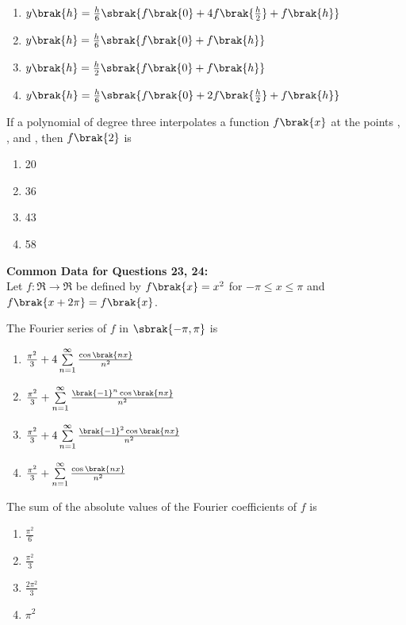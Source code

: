  \begin{enumerate}
     \item $y\brak{h} = \frac{h}{6}\sbrak{f\brak{0} + 4f\brak{\frac{h}{2}} + f\brak{h}}$
     \item $y\brak{h} = \frac{h}{6}\sbrak{f\brak{0} + f\brak{h}}$
     \item $y\brak{h} = \frac{h}{2}\sbrak{f\brak{0} + f\brak{h}}$
     \item $y\brak{h} = \frac{h}{6}\sbrak{f\brak{0} + 2f\brak{\frac{h}{2}} + f\brak{h}}$ \\
 \end{enumerate}
\item If a polynomial of degree three interpolates a function $f\brak{x}$ at the points , ,  and , then $f\brak{2}$ is
\begin{enumerate}
    \item 20
    \item 36
    \item 43
    \item 58 \\
\end{enumerate}
\textbf{Common Data for Questions 23, 24:} \\
Let $f : \mathfrak{R} \rightarrow \mathfrak{R}$ be defined by $f\brak{x} = x^2$ for $-\pi \leq x \leq \pi$ and $f\brak{x + 2\pi} = f\brak{x}$. \\
\item The Fourier series of $f$ in $\sbrak{-\pi, \pi}$ is
\begin{enumerate}
    \item $\frac{\pi^2}{3} + 4\sum\limits_{n=1}^{\infty}\frac{\cos\brak{nx}}{n^2}$
    \item $\frac{\pi^2}{3} + \sum\limits_{n=1}^{\infty}\frac{\brak{-1}^n\cos\brak{nx}}{n^2}$
    \item $\frac{\pi^2}{3} + 4\sum\limits_{n=1}^{\infty}\frac{\brak{-1}^2\cos\brak{nx}}{n^2}$
    \item $\frac{\pi^2}{3} + \sum\limits_{n=1}^{\infty}\frac{\cos\brak{nx}}{n^2}$ \\
\end{enumerate}
\item The sum of the absolute values of the Fourier coefficients of $f$ is
\begin{enumerate}
    \item $\frac{\pi^2}{6}$
    \item $\frac{\pi^2}{3}$
    \item $\frac{2\pi^2}{3}$
    \item $\pi^2$ \\
\end{enumerate}
